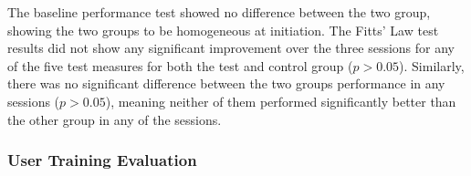 \begin{multicols}{2}

The baseline performance test showed no difference between the two group, showing the two groups to be homogeneous at initiation. The Fitts' Law test results did not show any significant improvement over the three sessions for any of the five test measures for both the test and control group ($p > 0.05$). Similarly, there was no significant difference between the two groups performance in any sessions ($p > 0.05$), meaning neither of them performed significantly better than the other group in any of the sessions.

\subsubsection*{User Training Evaluation} \label{sec:R:userTraining}


\end{multicols}
